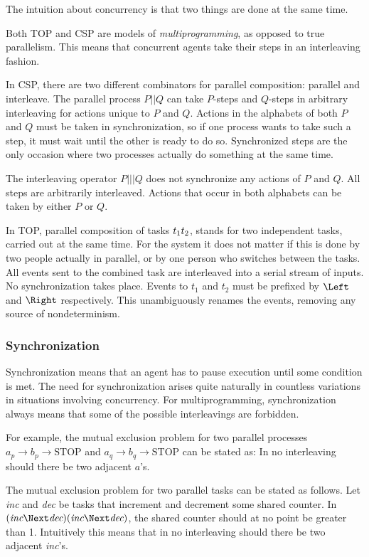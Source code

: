 The intuition about concurrency is that two things are done at the same time.

Both TOP and CSP are models of \emph{multiprogramming}, as opposed to true parallelism.
This means that concurrent agents take their steps in an interleaving fashion.

In CSP, there are two different combinators for parallel composition: parallel and interleave.
The parallel process $P || Q$ can take $P$-steps and $Q$-steps in arbitrary interleaving for actions unique to $P$ and $Q$.
Actions in the alphabets of both $P$ and $Q$ must be taken in synchronization, so if one process wants to take such a step, it must wait until the other is ready to do so.
Synchronized steps are the only occasion where two processes actually do something at the same time.

The interleaving operator $P ||| Q$ does not synchronize any actions of $P$ and $Q$.
All steps are arbitrarily interleaved.
Actions that occur in both alphabets can be taken by either $P$ or $Q$.

In TOP, parallel composition of tasks $t_1 \relax t_2$, stands for two independent tasks, carried out at the same time.
For the system it does not matter if this is done by two people actually in parallel, or by one person who switches between the tasks.
All events sent to the combined task are interleaved into a serial stream of inputs.
No synchronization takes place.
Events to $t_1$ and $t_2$ must be prefixed by $\Left$ and $\Right$ respectively.
This unambiguously renames the events, removing any source of nondeterminism.


\subsubsection{Synchronization}

Synchronization means that an agent has to pause execution until some condition is met.
The need for synchronization arises quite naturally in countless variations in situations involving concurrency.
For multiprogramming, synchronization always means that some of the possible interleavings are forbidden.

For example, the mutual exclusion problem for two parallel processes $a_p \to b_p \to \text{STOP} $ and $a_q \to b_q \to \text{STOP}$ can be stated as:
In no interleaving should there be two adjacent $a$'s.

The mutual exclusion problem for two parallel tasks can be stated as follows.
Let \textit{inc} and \textit{dec} be tasks that increment and decrement some shared counter.
In $(\textit{inc} \Next \textit{dec}) \And (\textit{inc} \Next \textit{dec})$, the shared counter should at no point be greater than 1.
Intuitively this means that in no interleaving should there be two adjacent \textit{inc}'s.

